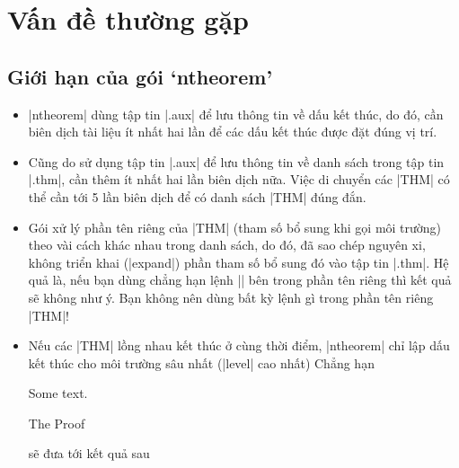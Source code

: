 \section{Vấn đề thường gặp}

\subsection{Giới hạn của gói `ntheorem'}


\begin{itemize}
 \item
  |ntheorem| dùng tập tin |.aux| để lưu thông tin về dấu kết thúc,
  do đó, cần biên dịch tài liệu ít nhất hai lần để các dấu
  kết thúc được đặt đúng vị trí.
 \item
	Cũng do sử dụng tập tin |.aux| để lưu thông tin về danh sách
	trong tập tin |.thm|, cần thêm ít nhất hai lần biên dịch nữa.
	Việc di chuyển các |THM| có thể cần tới 5 lần biên dịch
	để có danh sách |THM| đúng đắn.
 \item
	Gói xử lý phần tên riêng của |THM| (tham số bổ sung khi gọi môi trường)
	theo vài cách khác nhau trong danh sách, do đó, đã sao chép nguyên xi,
	không triển khai (|expand|) phần tham số bổ sung đó vào tập tin |.thm|.
	Hệ quả là, nếu bạn dùng chẳng hạn lệnh |\thesection| bên trong phần tên
	riêng thì kết quả sẽ không như ý. Bạn không nên dùng bất kỳ lệnh gì
	trong phần tên riêng |THM|!
 \item
	Nếu các |THM| lồng nhau kết thúc ở cùng thời điểm,
	|ntheorem| chỉ lập dấu kết thúc cho môi trường sâu nhất (|level| cao nhất)
	Chẳng hạn
\begin{example}
  \begin{Lemma}
   Some text.
   \begin{Proof}
     The Proof
   \end{Proof}
  \end{Lemma}
\end{example}
sẽ đưa tới kết quả sau


\end{itemize}
